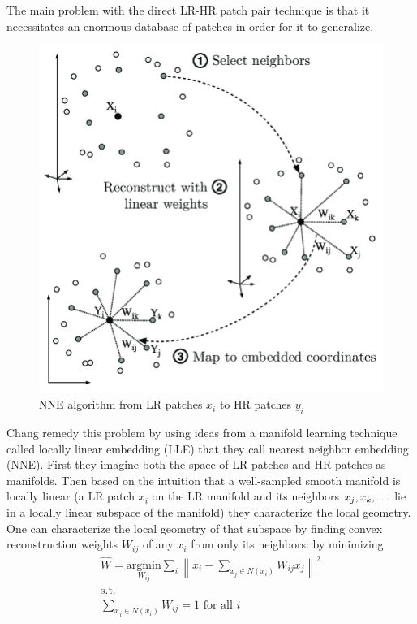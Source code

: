 The main problem with the direct LR-HR patch pair technique is that it necessitates an enormous database of patches in order for it to generalize.
%
\begin{figure}
    \centering
    \includegraphics[width=\linewidth,keepaspectratio]{figures/lle.png}
    \caption{NNE algorithm from LR patches $x_i$ to HR patches $y_i$\cite{Guillermophdthesis}}
    \label{fig:lle}
\end{figure}
Chang \etal remedy this problem by using ideas from a manifold learning technique called locally linear embedding\cite{saul2000introduction} (LLE) that they call nearest neighbor embedding (NNE).
%
First they imagine both the space of LR patches and HR patches as manifolds.
%
Then based on the intuition that a well-sampled smooth manifold is locally linear (a LR patch $x_i$ on the LR manifold and its neighbors $x_j, x_k, \mathellipsis$ lie in a locally linear subspace of the manifold) they characterize the local geometry.
%
One can characterize the local geometry of that subspace by finding convex reconstruction weights $W_{ij}$ of any $x_i$ from only its neighbors: by minimizing
\begin{equation}
    \begin{split}
        \hat{W} = \underset{W_{ij}}{\text{argmin}} \sum_i \left\| x_i - \sum_{x_j \in N(x_i)} W_{ij} x_j  \right\|^2 \\
        \text{s.t.} \\
        \sum_{x_j \in N(x_i)} W_{ij} = 1 \text{ for all }i
    \end{split}
\end{equation}
